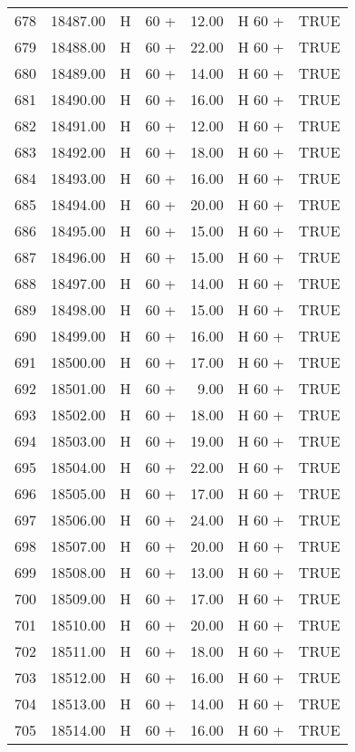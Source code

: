 \begin{table}[ht]
\begin{tabular}{rrllrll}
  678 & 18487.00 & H & 60 + & 12.00 & H 60 + & TRUE \\ 
  679 & 18488.00 & H & 60 + & 22.00 & H 60 + & TRUE \\ 
  680 & 18489.00 & H & 60 + & 14.00 & H 60 + & TRUE \\ 
  681 & 18490.00 & H & 60 + & 16.00 & H 60 + & TRUE \\ 
  682 & 18491.00 & H & 60 + & 12.00 & H 60 + & TRUE \\ 
  683 & 18492.00 & H & 60 + & 18.00 & H 60 + & TRUE \\ 
  684 & 18493.00 & H & 60 + & 16.00 & H 60 + & TRUE \\ 
  685 & 18494.00 & H & 60 + & 20.00 & H 60 + & TRUE \\ 
  686 & 18495.00 & H & 60 + & 15.00 & H 60 + & TRUE \\ 
  687 & 18496.00 & H & 60 + & 15.00 & H 60 + & TRUE \\ 
  688 & 18497.00 & H & 60 + & 14.00 & H 60 + & TRUE \\ 
  689 & 18498.00 & H & 60 + & 15.00 & H 60 + & TRUE \\ 
  690 & 18499.00 & H & 60 + & 16.00 & H 60 + & TRUE \\ 
  691 & 18500.00 & H & 60 + & 17.00 & H 60 + & TRUE \\ 
  692 & 18501.00 & H & 60 + & 9.00 & H 60 + & TRUE \\ 
  693 & 18502.00 & H & 60 + & 18.00 & H 60 + & TRUE \\ 
  694 & 18503.00 & H & 60 + & 19.00 & H 60 + & TRUE \\ 
  695 & 18504.00 & H & 60 + & 22.00 & H 60 + & TRUE \\ 
  696 & 18505.00 & H & 60 + & 17.00 & H 60 + & TRUE \\ 
  697 & 18506.00 & H & 60 + & 24.00 & H 60 + & TRUE \\ 
  698 & 18507.00 & H & 60 + & 20.00 & H 60 + & TRUE \\ 
  699 & 18508.00 & H & 60 + & 13.00 & H 60 + & TRUE \\ 
  700 & 18509.00 & H & 60 + & 17.00 & H 60 + & TRUE \\ 
  701 & 18510.00 & H & 60 + & 20.00 & H 60 + & TRUE \\ 
  702 & 18511.00 & H & 60 + & 18.00 & H 60 + & TRUE \\ 
  703 & 18512.00 & H & 60 + & 16.00 & H 60 + & TRUE \\ 
  704 & 18513.00 & H & 60 + & 14.00 & H 60 + & TRUE \\ 
  705 & 18514.00 & H & 60 + & 16.00 & H 60 + & TRUE \\ 

\end{tabular}
\end{table}
